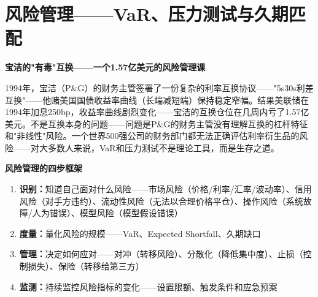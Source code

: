\documentclass[a4paper,11pt]{ctexbook}
\begin{document}
\newpage
\chapter{风险管理——VaR、压力测试与久期匹配}

\begin{scenario}
\textbf{宝洁的"有毒"互换——一个1.57亿美元的风险管理课}

1994年，宝洁（P\&G）的财务主管签署了一份复杂的利率互换协议——"5s30s利差互换"——他赌美国国债收益率曲线（长端减短端）保持稳定窄幅。结果美联储在1994年加息250bp，收益率曲线剧烈变化——宝洁的互换仓位在几周内亏了1.57亿美元。不是互换本身的问题——问题是P\&G的财务主管没有理解互换的杠杆特征和"非线性"风险。一个世界500强公司的财务部门都无法正确评估利率衍生品的风险——对大多数人来说，VaR和压力测试不是理论工具，而是生存之道。
\end{scenario}

\begin{qualitative}
\textbf{风险管理的四步框架}

\begin{enumerate}
  \item \textbf{识别：}知道自己面对什么风险——市场风险（价格/利率/汇率/波动率）、信用风险（对手方违约）、流动性风险（无法以合理价格平仓）、操作风险（系统故障/人为错误）、模型风险（模型假设错误）
  \item \textbf{度量：}量化风险的规模——VaR、Expected Shortfall、久期缺口
  \item \textbf{管理：}决定如何应对——对冲（转移风险）、分散化（降低集中度）、止损（控制损失）、保险（转移给第三方）
  \item \textbf{监测：}持续监控风险指标的变化——设置限额、触发条件和应急预案
\end{enumerate}
\end{qualitative}
\end{document}
